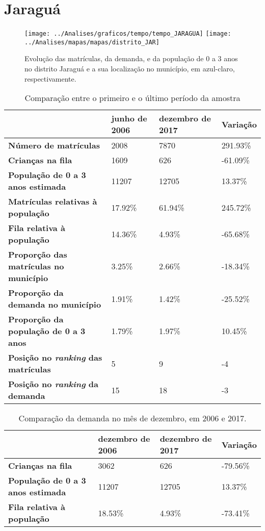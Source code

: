 \section{Jaraguá}
\begin{figure}[H]
\centering
\texttt{[image: ../Analises/graficos/tempo/tempo\_JARAGUA]}
\texttt{[image: ../Analises/mapas/mapas/distrito\_JAR]}
\caption{Evolução das matrículas, da demanda, e da população de 0 a 3 anos no distrito Jaraguá e a sua localização no município, em azul-claro, respectivamente.}
\end{figure}
\begin{table}[H]
\begin{tabular}{l|l|l|l}
\textbf{}                                      & \textbf{junho de 2006}       & \textbf{dezembro de 2017}    & \textbf{Variação} \\ \hline
\textbf{Número de matrículas}                  & 2008 & 7870 & 291.93\% \\ \hline
\textbf{Crianças na fila}                      & 1609 & 626 & -61.09\% \\ \hline
\textbf{População de 0 a 3 anos estimada}      & 11207 & 12705 & 13.37\% \\ \hline
\textbf{Matrículas relativas à população}      & 17.92\% & 61.94\% & 245.72\% \\ \hline
\textbf{Fila relativa à população}             & 14.36\% & 4.93\% & -65.68\% \\ \hline
\textbf{Proporção das matrículas no município} & 3.25\% & 2.66\% & -18.34\% \\ \hline
\textbf{Proporção da demanda no município}     & 1.91\% & 1.42\% & -25.52\% \\ \hline
\textbf{Proporção da população de 0 a 3 anos}  & 1.79\% & 1.97\% & 10.45\% \\ \hline
\textbf{Posição no \textit{ranking} das matrículas}     & 5 & 9 & -4 \\ \hline
\textbf{Posição no \textit{ranking} da demanda}         & 15 & 18 & -3 \\ 
\end{tabular}
\caption{Comparação entre o primeiro e o último período da amostra}
\end{table}
\begin{table}[H]
\begin{tabular}{l|l|l|l}
\textbf{}                                 & \textbf{dezembro de 2006} & \textbf{dezembro de 2017} & \textbf{Variação} \\ \hline
\textbf{Crianças na fila}                      & 3062 & 626 & -79.56\% \\ \hline
\textbf{População de 0 a 3 anos estimada}      & 11207 & 12705 & 13.37\% \\ \hline
\textbf{Fila relativa à população}             & 18.53\% & 4.93\% & -73.41\% \\
\end{tabular}
\caption{Comparação da demanda no mês de dezembro, em 2006 e 2017.}
\end{table}
